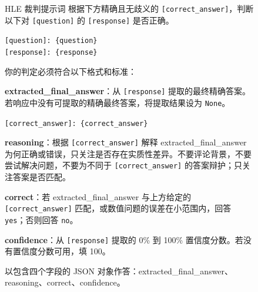 \begin{figure}[!htbp]
\begin{paperbox}{HLE 裁判提示词}
根据下方精确且无歧义的 \texttt{[correct\_answer]}，判断以下对 \texttt{[question]} 的 \texttt{[response]} 是否正确。

\vspace{0.3cm}
\texttt{[question]: \{question\}} \\
\texttt{[response]: \{response\}}

\vspace{0.3cm}
你的判定必须符合以下格式和标准：

\vspace{0.2cm}
\textbf{extracted\_final\_answer}：从 \texttt{[response]} 提取的最终精确答案。若响应中没有可提取的精确最终答案，将提取结果设为 \texttt{None}。

\vspace{0.2cm}
\texttt{[correct\_answer]: \{correct\_answer\}}

\vspace{0.2cm}
\textbf{reasoning}：根据 \texttt{[correct\_answer]} 解释 extracted\_final\_answer 为何正确或错误，只关注是否存在实质性差异。不要评论背景，不要尝试解决问题，不要为不同于 \texttt{[correct\_answer]} 的答案辩护；只关注答案是否匹配。

\vspace{0.2cm}
\textbf{correct}：若 extracted\_final\_answer 与上方给定的 \texttt{[correct\_answer]} 匹配，或数值问题的误差在小范围内，回答 \texttt{yes}；否则回答 \texttt{no}。

\vspace{0.2cm}
\textbf{confidence}：从 \texttt{[response]} 提取的 0\% 到 100\% 置信度分数。若没有置信度分数可用，填 100。

\vspace{0.2cm}
以包含四个字段的 JSON 对象作答：extracted\_final\_answer、reasoning、correct、confidence。
\end{paperbox}
\end{figure}
